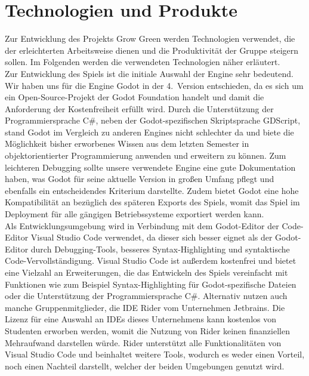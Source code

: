 \chapter{Technologien und Produkte}\label{ch:technologien}
Zur Entwicklung des Projekts Grow Green werden Technologien verwendet, die der erleichterten Arbeitsweise dienen
und die Produktivität der Gruppe steigern sollen. 
Im Folgenden werden die verwendeten Technologien näher erläutert. \\
\newline
Zur Entwicklung des Spiels ist die initiale Auswahl der Engine sehr bedeutend. 
Wir haben uns für die Engine Godot in der 4.\ Version entschieden, da es sich um ein Open-Source-Projekt der Godot 
Foundation handelt und damit die Anforderung der Kostenfreiheit erfüllt wird.
Durch die Unterstützung der Programmiersprache C\#, neben der Godot-spezifischen Skriptsprache GDScript, stand Godot 
im Vergleich zu anderen Engines nicht schlechter da und biete die Möglichkeit bisher erworbenes Wissen aus dem 
letzten Semester in objektorientierter Programmierung anwenden und erweitern zu können.
Zum leichteren Debugging sollte unsere verwendete Engine eine gute Dokumentation haben, was Godot für seine aktuelle 
Version in großen Umfang pflegt und ebenfalls ein entscheidendes Kriterium darstellte.
Zudem bietet Godot eine hohe Kompatibilität an bezüglich des späteren Exports des Spiels, womit das Spiel im 
Deployment für alle gängigen Betriebssysteme exportiert werden kann. \\
\newline
Als Entwicklungsumgebung wird in Verbindung mit dem Godot-Editor der Code-Editor Visual Studio Code verwendet, da
dieser sich besser eignet als der Godot-Editor durch Debugging-Tools, besseres Syntax-Highlighting und syntaktische
Code-Vervollständigung.
Visual Studio Code ist außerdem kostenfrei und bietet eine Vielzahl an Erweiterungen, die das Entwickeln des Spiels
vereinfacht mit Funktionen wie zum Beispiel Syntax-Highlighting für Godot-spezifische Dateien oder die Unterstützung der
Programmiersprache C\#.
Alternativ nutzen auch manche Gruppenmitglieder, die IDE Rider vom Unternehmen Jetbrains.
Die Lizenz für eine Auswahl an IDEs dieses Unternehmens kann kostenlos von Studenten erworben werden, womit die Nutzung
von Rider keinen finanziellen Mehraufwand darstellen würde.
Rider unterstützt alle Funktionalitäten von Visual Studio Code und beinhaltet weitere Tools, wodurch es weder einen
Vorteil, noch einen Nachteil darstellt, welcher der beiden Umgebungen genutzt wird.\\
